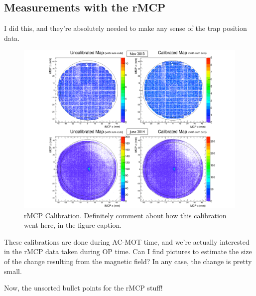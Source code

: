 

\subsection{Measurements with the rMCP}
	I did this, and they're absolutely needed to make any sense of the trap position data.  
\begin{figure}[h!!t]
	\centering
	\includegraphics[width=.999\linewidth]
	{Figures/rMCP_Calibration}
	\caption[rMCP Calibration]{rMCP Calibration.  Definitely comment about how this calibration went here, in the figure caption. }	
	\label{fig:rmcp_calibration}
\end{figure}
	These calibrations are done during AC-MOT time, and we're actually interested in the rMCP data taken during OP time.  Can I find pictures to estimate the size of the change resulting from the magnetic field?  In any case, the change is pretty small.  

Now, the unsorted bullet points for the rMCP stuff!


